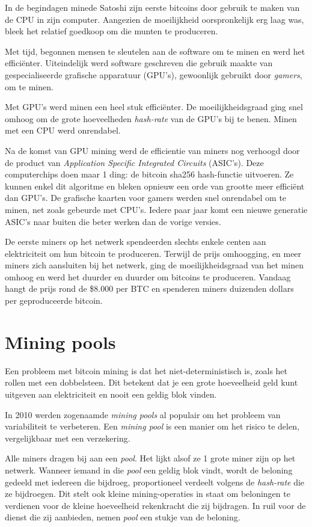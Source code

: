 \documentclass[
  letterpaper,
]{scrbook}
\begin{document}
In de begindagen minede Satoshi zijn eerste bitcoins door gebruik te
maken van de CPU in zijn computer. Aangezien de moeilijkheid
oorspronkelijk erg laag was, bleek het relatief goedkoop om die munten
te produceren.

Met tijd, begonnen mensen te sleutelen aan de software om te minen en
werd het efficiënter. Uiteindelijk werd software geschreven die gebruik
maakte van gespecialiseerde grafische apparatuur (GPU's), gewoonlijk
gebruikt door \emph{gamers}, om te minen.

Met GPU's werd minen een heel stuk efficiënter. De moeilijkheidsgraad
ging snel omhoog om de grote hoeveelheden \emph{hash-rate} van de GPU's
bij te benen. Minen met een CPU werd onrendabel.

Na de komst van GPU mining werd de efficientie van miners nog verhoogd
door de product van \emph{Application Specific Integrated Circuits}
(ASIC's). Deze computerchips doen maar 1 ding: de bitcoin sha256
hash-functie uitvoeren. Ze kunnen enkel dit algoritme en bleken opnieuw
een orde van grootte meer efficiënt dan GPU's. De grafische kaarten voor
gamers werden snel onrendabel om te minen, net zoals gebeurde met CPU's.
Iedere paar jaar komt een nieuwe generatie ASIC's naar buiten die beter
werken dan de vorige versies.

De eerste miners op het netwerk spendeerden slechts enkele centen aan
elektriciteit om hun bitcoin te produceren. Terwijl de prijs omhoogging,
en meer miners zich aansluiten bij het netwerk, ging de
moeilijkheidsgraad van het minen omhoog en werd het duurder en duurder
om bitcoins te produceren. Vandaag hangt de prijs rond de \$8.000 per
BTC en spenderen miners duizenden dollars per geproduceerde bitcoin.

\hypertarget{mining-pools}{%
\section{Mining pools}\label{mining-pools}}

Een probleem met bitcoin mining is dat het niet-deterministisch is,
zoals het rollen met een dobbelsteen. Dit betekent dat je een grote
hoeveelheid geld kunt uitgeven aan elektriciteit en nooit een geldig
blok vinden.

In 2010 werden zogenaamde \emph{mining pools} al populair om het
probleem van variabiliteit te verbeteren. Een \emph{mining pool} is een
manier om het risico te delen, vergelijkbaar met een verzekering.

Alle miners dragen bij aan een \emph{pool}. Het lijkt alsof ze 1 grote
miner zijn op het netwerk. Wanneer iemand in die \emph{pool} een geldig
blok vindt, wordt de beloning gedeeld met iedereen die bijdroeg,
proportioneel verdeelt volgens de \emph{hash-rate} die ze bijdroegen.
Dit stelt ook kleine mining-operaties in staat om beloningen te
verdienen voor de kleine hoeveelheid rekenkracht die zij bijdragen. In
ruil voor de dienst die zij aanbieden, nemen \emph{pool} een stukje van
de beloning.
\end{document}
